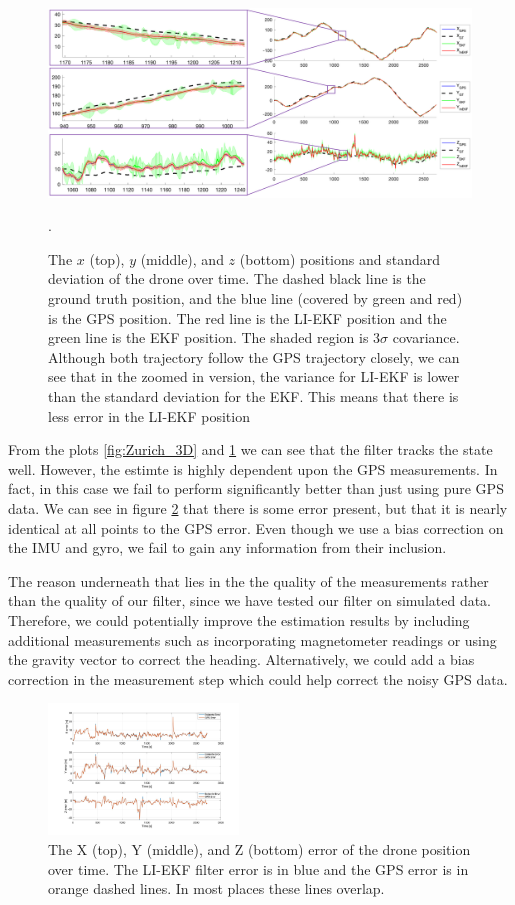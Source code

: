 \begin{figure}[h]
    \centering
    \includegraphics[width=.8\textwidth]{sections/figures/zurich_pos_std.png}
    \caption{The $x$ (top), $y$ (middle), and $z$ (bottom) positions and standard deviation of the drone over time. 
    The dashed black line is the ground truth position, and the blue line (covered by green and red) is the GPS position. The red line is the LI-EKF position and the green line is the EKF position. The shaded region is $3\sigma$ covariance. Although both trajectory follow the GPS trajectory closely, we can see that in the zoomed in version, the variance for LI-EKF is lower than the standard deviation for the EKF. This means that there is less error in the LI-EKF position}.
    \label{fig:Zurich_XYZ}
\end{figure}

From the plots \ref{fig:Zurich_3D} and \ref{fig:Zurich_XYZ} we can see that the filter tracks the state well. However, the estimte is highly dependent upon the GPS measurements. In fact, in this case we fail to perform significantly better than just using pure GPS data. We can see in figure \ref{fig:Zurich_error} that there is some error present, but that it is nearly identical at all points to the GPS error. Even though we use a bias correction on the IMU and gyro, we fail to gain any information from their inclusion. 

The reason underneath that lies in the the quality of the measurements rather than the quality of our filter, since we have tested our filter on simulated data. Therefore, we could potentially improve the estimation results by including additional measurements such as incorporating magnetometer readings or using the gravity vector to correct the heading. Alternatively, we could add a bias correction in the measurement step which could help correct the noisy GPS data.

\begin{figure}
    \centering
    \includegraphics[width=0.45\textwidth]{sections/figures/Zurich_error.jpg}
    \caption{The X (top), Y (middle), and Z (bottom) error of the drone position over time. The LI-EKF filter error is in blue and the GPS error is in orange dashed lines. In most places these lines overlap.}
    \label{fig:Zurich_error}
\end{figure}

